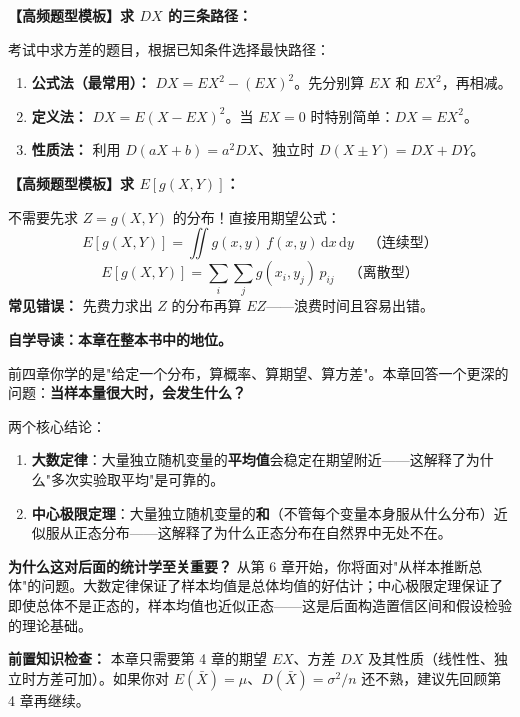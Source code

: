 ﻿\documentclass[lang=cn,11pt]{elegantbook}
\begin{document}
\begin{note}
\textbf{【高频题型模板】求 $DX$ 的三条路径：}

考试中求方差的题目，根据已知条件选择最快路径：
\begin{enumerate}
    \item \textbf{公式法（最常用）：} $DX=EX^2-(EX)^2$。先分别算 $EX$ 和 $EX^2$，再相减。
    \item \textbf{定义法：} $DX=E(X-EX)^2$。当 $EX=0$ 时特别简单：$DX=EX^2$。
    \item \textbf{性质法：} 利用 $D(aX+b)=a^2DX$、独立时 $D(X\pm Y)=DX+DY$。
\end{enumerate}

\textbf{【高频题型模板】求 $E[g(X,Y)]$：}

不需要先求 $Z=g(X,Y)$ 的分布！直接用期望公式：
\[
E[g(X,Y)]=\iint g(x,y)\,f(x,y)\,\mathrm{d}x\,\mathrm{d}y\quad\text{（连续型）}
\]
\[
E[g(X,Y)]=\sum_i\sum_j g(x_i,y_j)\,p_{ij}\quad\text{（离散型）}
\]
\textbf{常见错误：} 先费力求出 $Z$ 的分布再算 $EZ$——浪费时间且容易出错。
\end{note}

\begin{note}
\textbf{自学导读：本章在整本书中的地位。}

前四章你学的是"给定一个分布，算概率、算期望、算方差"。本章回答一个更深的问题：\textbf{当样本量很大时，会发生什么？}

两个核心结论：
\begin{enumerate}
    \item \textbf{大数定律}：大量独立随机变量的\textbf{平均值}会稳定在期望附近——这解释了为什么"多次实验取平均"是可靠的。
    \item \textbf{中心极限定理}：大量独立随机变量的\textbf{和}（不管每个变量本身服从什么分布）近似服从正态分布——这解释了为什么正态分布在自然界中无处不在。
\end{enumerate}

\textbf{为什么这对后面的统计学至关重要？} 从第 6 章开始，你将面对"从样本推断总体"的问题。大数定律保证了样本均值是总体均值的好估计；中心极限定理保证了即使总体不是正态的，样本均值也近似正态——这是后面构造置信区间和假设检验的理论基础。

\textbf{前置知识检查：} 本章只需要第 4 章的期望 $EX$、方差 $DX$ 及其性质（线性性、独立时方差可加）。如果你对 $E(\bar{X})=\mu$、$D(\bar{X})=\sigma^2/n$ 还不熟，建议先回顾第 4 章再继续。
\end{note}
\end{document}

